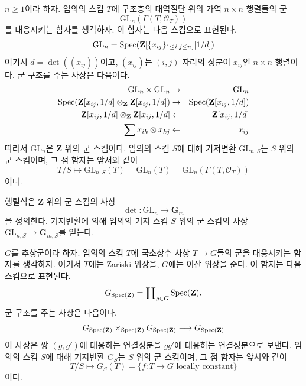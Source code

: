 \begin{example}[일반선형군 스킴]
\label{example-general-linear-group}
$n \geq 1$이라 하자. 임의의 스킴 $T$에 구조층의 대역절단 위의 가역
$n \times n$ 행렬들의 군
$$
\text{GL}_n(\Gamma(T, \mathcal{O}_T))
$$
를 대응시키는 함자를 생각하자. 이 함자는 다음 스킴으로 표현된다.
$$
\text{GL}_n = \mathop{\mathrm{Spec}}(\mathbf{Z}[\{x_{ij}\}_{1 \leq i, j \leq n}][1/d])
$$
여기서 $d = \det((x_{ij}))$이고, $(x_{ij})$는 $(i, j)$-자리의 성분이 $x_{ij}$인
$n \times n$ 행렬이다. 군 구조를 주는 사상은 다음이다.
\begin{eqnarray*}
\text{GL}_n \times \text{GL}_n & \to & \text{GL}_n \\
\mathop{\mathrm{Spec}}(\mathbf{Z}[x_{ij}, 1/d] \otimes_{\mathbf{Z}}
\mathbf{Z}[x_{ij}, 1/d])
& \to &
\mathop{\mathrm{Spec}}(\mathbf{Z}[x_{ij}, 1/d]) \\
\mathbf{Z}[x_{ij}, 1/d] \otimes_{\mathbf{Z}} \mathbf{Z}[x_{ij}, 1/d]
& \leftarrow &
\mathbf{Z}[x_{ij}, 1/d] \\
\sum x_{ik} \otimes x_{kj} & \leftarrow & x_{ij}
\end{eqnarray*}
따라서 $\text{GL}_n$은 $\mathbf{Z}$ 위의 군 스킴이다. 임의의 스킴 $S$에 대해 기저변환
$\text{GL}_{n, S}$는 $S$ 위의 군 스킴이며, 그 점 함자는 앞서와 같이
$$
T/S
\longmapsto
\text{GL}_{n, S}(T) = \text{GL}_n(T) =\text{GL}_n(\Gamma(T, \mathcal{O}_T))
$$
이다.
\end{example}

\begin{example}
\label{example-determinant}
행렬식은 $\mathbf{Z}$ 위의 군 스킴의 사상
$$
\det : \text{GL}_n \longrightarrow \mathbf{G}_m
$$
을 정의한다. 기저변환에 의해 임의의 기저 스킴 $S$ 위의 군 스킴의 사상
$\text{GL}_{n, S} \to \mathbf{G}_{m, S}$를 얻는다.
\end{example}

\begin{example}[상수군]
\label{example-constant-group}
$G$를 추상군이라 하자. 임의의 스킴 $T$에 국소상수 사상 $T \to G$들의 군을
대응시키는 함자를 생각하자. 여기서 $T$에는 Zariski 위상을, $G$에는 이산 위상을 준다.
이 함자는 다음 스킴으로 표현된다.
$$
G_{\mathop{\mathrm{Spec}}(\mathbf{Z})} =
\coprod\nolimits_{g \in G} \mathop{\mathrm{Spec}}(\mathbf{Z}).
$$
군 구조를 주는 사상은 다음이다.
$$
G_{\mathop{\mathrm{Spec}}(\mathbf{Z})}
\times_{\mathop{\mathrm{Spec}}(\mathbf{Z})}
G_{\mathop{\mathrm{Spec}}(\mathbf{Z})}
\longrightarrow
G_{\mathop{\mathrm{Spec}}(\mathbf{Z})}
$$
이 사상은 쌍 $(g, g')$에 대응하는 연결성분을 $gg'$에 대응하는 연결성분으로 보낸다.
임의의 스킴 $S$에 대해 기저변환 $G_S$는 $S$ 위의 군 스킴이며, 그 점 함자는
앞서와 같이
$$
T/S
\longmapsto
G_S(T) = \{f : T \to G \text{ locally constant}\}
$$
이다.
\end{example}





